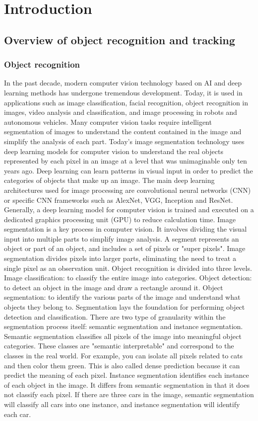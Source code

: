 \chapter{Introduction}\label{chap:intro}

\section{Overview of object recognition and tracking}
\subsection{Object recognition}
In the past decade, modern computer vision technology based on AI and deep learning methods has undergone tremendous development. Today, it is used in applications such as image classification, facial recognition, object recognition in images, video analysis and classification, and image processing in robots and autonomous vehicles. Many computer vision tasks require intelligent segmentation of images to understand the content contained in the image and simplify the analysis of each part. Today's image segmentation technology uses deep learning models for computer vision to understand the real objects represented by each pixel in an image at a level that was unimaginable only ten years ago. Deep learning can learn patterns in visual input in order to predict the categories of objects that make up an image. The main deep learning architectures used for image processing are convolutional neural networks (CNN) or specific CNN frameworks such as AlexNet, VGG, Inception and ResNet. Generally, a deep learning model for computer vision is trained and executed on a dedicated graphics processing unit (GPU) to reduce calculation time.
Image segmentation is a key process in computer vision. It involves dividing the visual input into multiple parts to simplify image analysis. A segment represents an object or part of an object, and includes a set of pixels or "super pixels". Image segmentation divides pixels into larger parts, eliminating the need to treat a single pixel as an observation unit. Object recognition is divided into three levels. Image classification: to classify the entire image into categories. Object detection: to detect an object in the image and draw a rectangle around it. Object segmentation: to identify the various parts of the image and understand what objects they belong to. Segmentation lays the foundation for performing object detection and classification. There are two type of granularity within the segmentation process itself: semantic segmentation and instance segmentation. Semantic segmentation classifies all pixels of the image into meaningful object categories. These classes are "semantic interpretable" and correspond to the classes in the real world. For example, you can isolate all pixels related to cats and then color them green. This is also called dense prediction because it can predict the meaning of each pixel. Instance segmentation identifies each instance of each object in the image. It differs from semantic segmentation in that it does not classify each pixel. If there are three cars in the image, semantic segmentation will classify all cars into one instance, and instance segmentation will identify each car.
